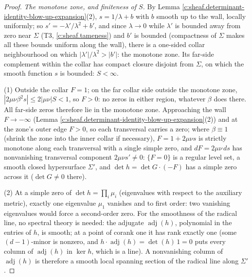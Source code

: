 \documentclass[11pt]{article}
\theoremstyle{definition}
\theoremstyle{plain}
\providecommand{\Sig}{}\renewcommand{\Sig}{\Sigma}
\begin{document}
\begin{proof}
\emph{The monotone zone, and finiteness of $S$.} By Lemma \ref{c:sheaf.determinant-identity-blow-up-expansion}(2), $s = 1/\lambda + b$ with $b$ smooth up to the wall, locally uniformly; so $s' = -\lambda'/\lambda^2 + b'$, and since $\lambda \to 0$ while $\lambda'$ is bounded away from zero near $\Sig$ (T3, \ref{c:sheaf.tameness}) and $b'$ is bounded (compactness of $\Sig$ makes all these bounds uniform along the wall), there is a one-sided collar neighbourhood on which $|\lambda'|/\lambda^2 > |b'|$: the monotone zone. Its far-side complement within the collar has compact closure disjoint from $\Sig$, on which the smooth function $s$ is bounded: $S < \infty$.

(1) Outside the collar $F = 1$; on the far collar side outside the monotone zone, $|2\mu\nu\beta^2 s| \leq 2|\mu\nu| S < 1$, so $F > 0$: no zeros in either region, whatever $\beta$ does there. All far-side zeros therefore lie in the monotone zone. Approaching the wall $F \to -\infty$ (Lemma \ref{c:sheaf.determinant-identity-blow-up-expansion}(2)) and at the zone's outer edge $F > 0$, so each transversal carries a zero; where $\beta \equiv 1$ (shrink the zone into the inner collar if necessary), $F = 1 + 2\mu\nu s$ is strictly monotone along each transversal with a single simple zero, and $dF = 2\mu\nu\, ds$ has nonvanishing transversal component $2\mu\nu s' \neq 0$: $\{F = 0\}$ is a regular level set, a smooth closed hypersurface $\Sig'$, and $\det h = \det G \cdot (-F)$ has a simple zero across it ($\det G \neq 0$ there).

(2) At a simple zero of $\det h = \prod_i \mu_i$ (eigenvalues with respect to the auxiliary metric), exactly one eigenvalue $\mu_1$ vanishes and to first order: two vanishing eigenvalues would force a second-order zero. For the smoothness of the radical line, no spectral theory is needed: the adjugate $\operatorname{adj}(h)$, polynomial in the entries of $h$, is smooth; at a point of corank one it has rank exactly one (some $(d{-}1)$-minor is nonzero, and $h \cdot \operatorname{adj}(h) = \det(h)\,1 = 0$ puts every column of $\operatorname{adj}(h)$ in $\ker h$, which is a line). A nonvanishing column of $\operatorname{adj}(h)$ is therefore a smooth local spanning section of the radical line along $\Sig'$.


\end{proof}
\end{document}
